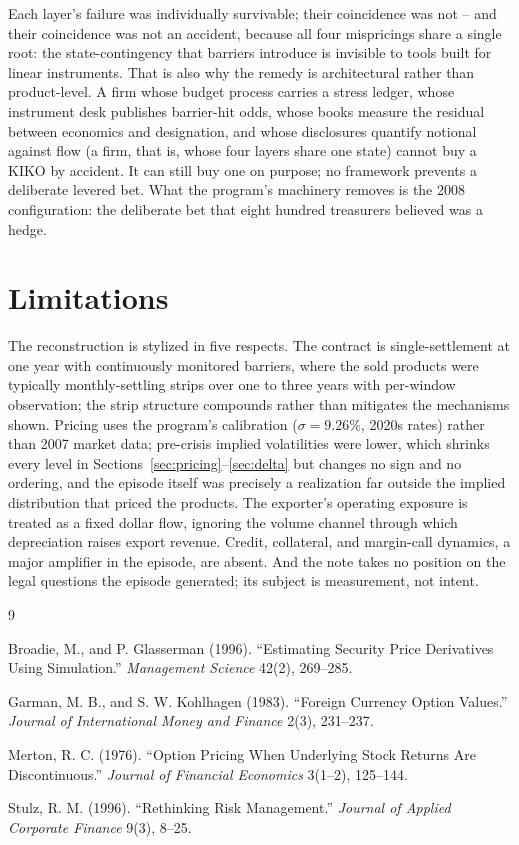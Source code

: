 \documentclass[11pt,a4paper]{article}
\begin{document}
Each layer's failure was individually survivable; their coincidence was not -- and their coincidence was not an accident, because all four mispricings share a single root: the state-contingency that barriers introduce is invisible to tools built for linear instruments. That is also why the remedy is architectural rather than product-level. A firm whose budget process carries a stress ledger, whose instrument desk publishes barrier-hit odds, whose books measure the residual between economics and designation, and whose disclosures quantify notional against flow (a firm, that is, whose four layers share one state) cannot buy a KIKO by accident. It can still buy one on purpose; no framework prevents a deliberate levered bet. What the program's machinery removes is the 2008 configuration: the deliberate bet that eight hundred treasurers believed was a hedge.

\section{Limitations}
\label{sec:limits}

The reconstruction is stylized in five respects. The contract is single-settlement at one year with continuously monitored barriers, where the sold products were typically monthly-settling strips over one to three years with per-window observation; the strip structure compounds rather than mitigates the mechanisms shown. Pricing uses the program's calibration ($\sigma=9.26\%$, 2020s rates) rather than 2007 market data; pre-crisis implied volatilities were lower, which shrinks every level in Sections~\ref{sec:pricing}--\ref{sec:delta} but changes no sign and no ordering, and the episode itself was precisely a realization far outside the implied distribution that priced the products. The exporter's operating exposure is treated as a fixed dollar flow, ignoring the volume channel through which depreciation raises export revenue. Credit, collateral, and margin-call dynamics, a major amplifier in the episode, are absent. And the note takes no position on the legal questions the episode generated; its subject is measurement, not intent.

\begin{thebibliography}{9}

 Broadie, M., and P. Glasserman (1996). ``Estimating Security Price Derivatives Using Simulation.'' \emph{Management Science} 42(2), 269--285.

 Garman, M. B., and S. W. Kohlhagen (1983). ``Foreign Currency Option Values.'' \emph{Journal of International Money and Finance} 2(3), 231--237.

 Merton, R. C. (1976). ``Option Pricing When Underlying Stock Returns Are Discontinuous.'' \emph{Journal of Financial Economics} 3(1--2), 125--144.

 Stulz, R. M. (1996). ``Rethinking Risk Management.'' \emph{Journal of Applied Corporate Finance} 9(3), 8--25.

\end{thebibliography}
\end{document}
